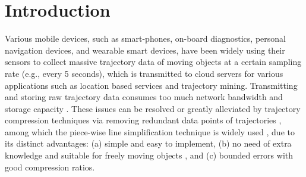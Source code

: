 \section{Introduction}
\label{sec-intro}

Various mobile devices, such as smart-phones, on-board diagnostics, personal navigation devices, and wearable smart devices, have been widely using their sensors to collect massive trajectory data of moving objects at a certain sampling rate (e.g., every 5 seconds), which is transmitted to cloud servers for various applications such as location based services and trajectory mining.
%
Transmitting and storing raw trajectory data consumes too much network bandwidth and storage capacity \cite{Chen:Trajectory, Meratnia:Spatiotemporal, Liu:BQS, Muckell:Compression,Cao:Spatio, Popa:Spatio,Nibali:Trajic}. %
%
%
These issues can be resolved or greatly alleviated by trajectory compression techniques via removing redundant data points of trajectories \cite{Douglas:Peucker, Hershberger:Speeding, Meratnia:Spatiotemporal, Liu:BQS, Muckell:survey, Muckell:Compression, Chen:Trajectory, Cao:Spatio, Shi:Survey, Nibali:Trajic, Long:Direction, Popa:Spatio, Song:PRESS}, among which the piece-wise line {simplification} technique is widely used \cite{Douglas:Peucker, Meratnia:Spatiotemporal, Muckell:survey, Muckell:Compression, Chen:Trajectory, Cao:Spatio, Shi:Survey, Liu:BQS, Lin:Operb}, due to its distinct advantages: (a) simple and easy to implement, (b) no need of extra knowledge and suitable for freely  moving  objects \cite{Popa:Spatio}, and (c) bounded errors with good compression ratios.

